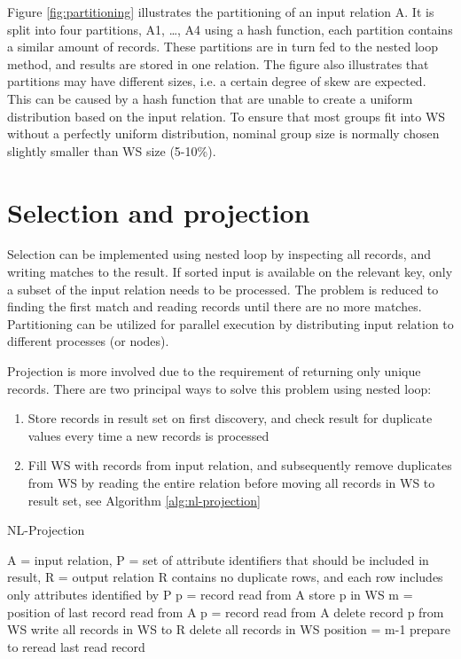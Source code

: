 Figure \ref{fig:partitioning} illustrates the partitioning of an input
relation A. It is split into four partitions, A1, \ldots, A4 using a
hash function, each partition contains a similar amount of records.
These partitions are in turn fed to the nested loop method, and
results are stored in one relation. The figure also illustrates that
partitions may have different sizes, i.e. a certain degree of skew are
expected. This can be caused by a hash function that are unable to
create a uniform distribution based on the input relation. To ensure
that most groups fit into WS without a perfectly uniform distribution,
nominal group size is normally chosen slightly smaller than WS size
(5-10\%).

\section{Selection and projection}

Selection can be implemented using nested loop by inspecting all
records, and writing matches to the result. If sorted input is
available on the relevant key, only a subset of the input relation
needs to be processed. The problem is reduced to finding the first
match and reading records until there are no more matches.
Partitioning can be utilized for parallel execution by distributing
input relation to different processes (or nodes).

Projection is more involved due to the requirement of returning only
unique records. There are two principal ways to solve this problem
using nested loop:

\begin{enumerate}
	\item Store records in result set on first discovery, and check
	result for duplicate values every time a new records is processed
	\item Fill WS with records from input relation, and subsequently
	remove duplicates from WS by reading the entire relation before
	moving all records in WS to result set, see Algorithm \ref{alg:nl-projection}
\end{enumerate}

\begin{algorithm}
	\caption{NL-Projection}
	\label{alg:nl-projection}
	\begin{algorithmic}
		\REQUIRE A = input relation, 
		P = set of attribute identifiers that should be included in
		result, R = output relation
		\ENSURE R contains no duplicate rows, and each row includes only
		attributes identified by P
			\STATE p = record read from A
				\STATE store p in WS 
			\ENDIF
				\STATE m = position of last record read from A
					\STATE p = record read from A
						\STATE delete record p from WS
					\ENDIF
				\ENDWHILE
			\ENDIF
			\STATE write all records in WS to R
			\STATE delete all records in WS
			\STATE position = m-1 {prepare to reread last read record}
		\ENDWHILE
	\end{algorithmic}
\end{algorithm}

